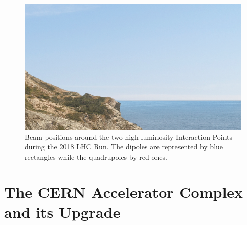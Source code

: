 
\begin{figure}[h]
  \centering
  \includegraphics[width=0.5\columnwidth]{Figures/placeholder.png}
  \caption{Beam positions around the two high luminosity Interaction Points during the 2018 LHC Run. The dipoles are represented by blue rectangles while the quadrupoles by red ones.}
  \label{fig:ir1_ir5_beam_positions}
\end{figure}


\section{The CERN Accelerator Complex and its Upgrade}

